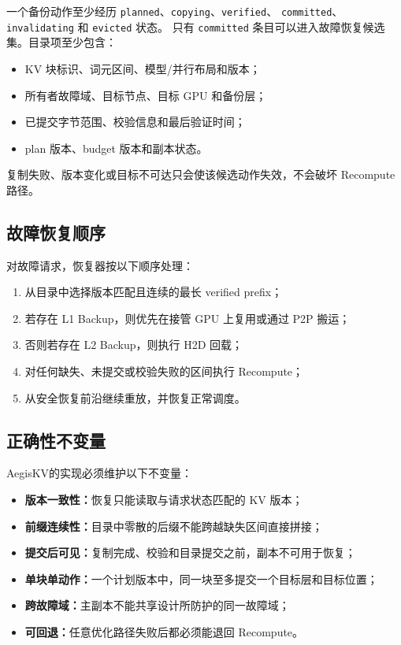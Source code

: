 \documentclass[UTF8,11pt,a4paper,fontset=fandol]{ctexart}
\newcommand{\AegisKV}{AegisKV}
\newcommand{\code}[1]{\texttt{#1}}
\begin{document}
一个备份动作至少经历
\code{planned}、\code{copying}、\code{verified}、
\code{committed}、\code{invalidating} 和 \code{evicted} 状态。
只有 \code{committed} 条目可以进入故障恢复候选集。目录项至少包含：

\begin{itemize}
  \item KV 块标识、词元区间、模型/并行布局和版本；
  \item 所有者故障域、目标节点、目标 GPU 和备份层；
  \item 已提交字节范围、校验信息和最后验证时间；
  \item plan 版本、budget 版本和副本状态。
\end{itemize}

复制失败、版本变化或目标不可达只会使该候选动作失效，不会破坏 Recompute 路径。

\subsection{故障恢复顺序}

对故障请求，恢复器按以下顺序处理：

\begin{enumerate}
  \item 从目录中选择版本匹配且连续的最长 verified prefix；
  \item 若存在 L1 Backup，则优先在接管 GPU 上复用或通过 P2P 搬运；
  \item 否则若存在 L2 Backup，则执行 H2D 回载；
  \item 对任何缺失、未提交或校验失败的区间执行 Recompute；
  \item 从安全恢复前沿继续重放，并恢复正常调度。
\end{enumerate}

\subsection{正确性不变量}

\AegisKV 的实现必须维护以下不变量：

\begin{itemize}
  \item \textbf{版本一致性：}恢复只能读取与请求状态匹配的 KV 版本；
  \item \textbf{前缀连续性：}目录中零散的后缀不能跨越缺失区间直接拼接；
  \item \textbf{提交后可见：}复制完成、校验和目录提交之前，副本不可用于恢复；
  \item \textbf{单块单动作：}一个计划版本中，同一块至多提交一个目标层和目标位置；
  \item \textbf{跨故障域：}主副本不能共享设计所防护的同一故障域；
  \item \textbf{可回退：}任意优化路径失败后都必须能退回 Recompute。
\end{itemize}
\end{document}
